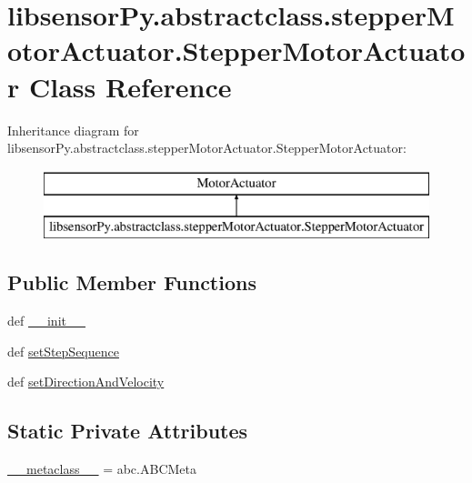 \hypertarget{classlibsensorPy_1_1abstractclass_1_1stepperMotorActuator_1_1StepperMotorActuator}{}\section{libsensor\+Py.\+abstractclass.\+stepper\+Motor\+Actuator.\+Stepper\+Motor\+Actuator Class Reference}
\label{classlibsensorPy_1_1abstractclass_1_1stepperMotorActuator_1_1StepperMotorActuator}
Inheritance diagram for libsensor\+Py.\+abstractclass.\+stepper\+Motor\+Actuator.\+Stepper\+Motor\+Actuator\+:\begin{figure}[H]
\begin{center}
\leavevmode
\includegraphics[height=2.000000cm]{classlibsensorPy_1_1abstractclass_1_1stepperMotorActuator_1_1StepperMotorActuator}
\end{center}
\end{figure}
\subsection*{Public Member Functions}
\begin{DoxyCompactItemize}
\item 
def \hyperlink{classlibsensorPy_1_1abstractclass_1_1stepperMotorActuator_1_1StepperMotorActuator_a0761bb179645cdc4f8d2f968f31e55ee}{\+\_\+\+\_\+init\+\_\+\+\_\+}
\item 
def \hyperlink{classlibsensorPy_1_1abstractclass_1_1stepperMotorActuator_1_1StepperMotorActuator_a6c1d3dbdc0803ee801bb549b7624534b}{set\+Step\+Sequence}
\item 
def \hyperlink{classlibsensorPy_1_1abstractclass_1_1stepperMotorActuator_1_1StepperMotorActuator_acd515b0f99c4b0d397135f2466010e61}{set\+Direction\+And\+Velocity}
\end{DoxyCompactItemize}
\subsection*{Static Private Attributes}
\begin{DoxyCompactItemize}
\item 
\hyperlink{classlibsensorPy_1_1abstractclass_1_1stepperMotorActuator_1_1StepperMotorActuator_acc74268bf305cbccc36471d56f4feff5}{\+\_\+\+\_\+metaclass\+\_\+\+\_\+} = abc.\+A\+B\+C\+Meta
\end{DoxyCompactItemize}


